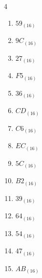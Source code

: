 \begin{multicols}{4}
\begin{enumerate}
        \phantom{$=50$}

  \item $59_{(16)}$

        \phantom{$=89$}

  \item $9C_{(16)}$

        \phantom{$=156$}

  \item $27_{(16)}$

        \phantom{$=39$}

  \item $F5_{(16)}$

        \phantom{$=245$}

  \item $36_{(16)}$

        \phantom{$=54$}

  \item $CD_{(16)}$

        \phantom{$=205$}

  \item $C6_{(16)}$

        \phantom{$=198$}

  \item $EC_{(16)}$

        \phantom{$=236$}

  \item $5C_{(16)}$

        \phantom{$=92$}

\columnbreak %

\resetques

  \item $B2_{(16)}$

        \phantom{$=178$}

  \item $39_{(16)}$

        \phantom{$=57$}

  \item $64_{(16)}$

        \phantom{$=100$}

  \item $54_{(16)}$

        \phantom{$=84$}

  \item $47_{(16)}$

        \phantom{$=71$}

  \item $AB_{(16)}$


\end{enumerate}
\end{multicols}
